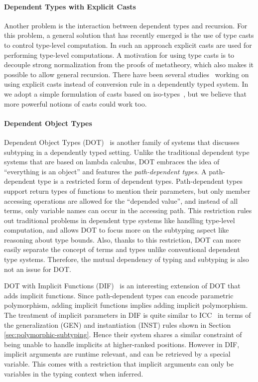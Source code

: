 \paragraph{Dependent Types with Explicit Casts} Another problem is the
interaction between dependent types and recursion. For this
problem, a general solution that has recently emerged is the use
of type casts to control type-level computation. In such an approach explicit casts
are used for performing type-level computations. A motivation for
using type casts is to decouple strong normalization from the
proofs of metatheory, which also makes it possible to allow general
recursion. There have been several studies~\citep{guru,sjoberg:msfp12,
  kimmel:plpv, zombie:popl15, fc:kind, Doorn:2013hq,isotype} working
on using explicit casts instead of conversion rule in a dependently
typed system. In \name we adopt a simple formulation of casts based
on iso-types~\citep{isotype}, but we believe that more powerful notions
of casts could work too.

\paragraph{Dependent Object Types}

Dependent Object Types (DOT)~\citep{dot:dot,dot:path,dot:sound} is another
family of systems that discusses subtyping in a dependently typed setting.
Unlike the traditional dependent type systems that are based on lambda calculus, DOT
embraces the idea of ``everything is an object'' and features the \emph{path-dependent types}.
A path-dependent type is a restricted form of dependent types.
Path-dependent types support return types of functions to mention their parameters, but only
member accessing operations are allowed for the ``depended value'',
and instead of all terms, only variable names can occur in the accessing path.
This restriction rules out traditional problems in dependent type systems
like handling type-level computation, and allows DOT to focus more on the subtyping
aspect like reasoning about type bounds. Also, thanks to this restriction, DOT
can more easily separate the concept of terms and types unlike conventional dependent type systems.
Therefore, the mutual dependency of typing and subtyping is also not an issue for DOT.

DOT with Implicit Functions (DIF)~\citep{dif} is an interesting extension of DOT
that adds implicit functions.
Since path-dependent types can encode parametric
polymorphism, adding implicit functions implies adding implicit polymorphism.
The treatment of implicit parameters in DIF is quite similar
to ICC~\citep{miquel2001implicit} in terms of the generalization (GEN) and
instantiation (INST) rules shown in Section \ref{sec:polymorphic-subtyping}.
Hence their system shares a similar constraint of being unable to handle implicits
at higher-ranked positions. However in DIF, implicit arguments are runtime relevant,
and can be retrieved by a special variable. This comes with a restriction that
implicit arguments can only be variables in the typing context when inferred.

